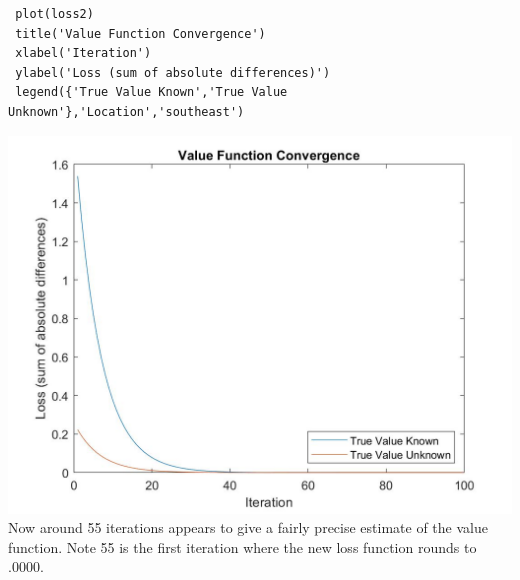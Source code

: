 \documentclass[12pt]{article}
\begin{document}
\begin{onehalfspace}
\begin{enumerate}[1.]
\begin{lstlisting}
 plot(loss2)
 title('Value Function Convergence')
 xlabel('Iteration')
 ylabel('Loss (sum of absolute differences)')
 legend({'True Value Known','True Value Unknown'},'Location','southeast')
	\end{lstlisting}
	\includegraphics[width=\textwidth]{Econ_8307_PS2_4_4.jpg}
	Now around 55 iterations appears to give a fairly precise estimate of the value function. Note 55 is the first iteration where the new loss function rounds to .0000.
\end{enumerate}



\end{onehalfspace}
\end{document}
